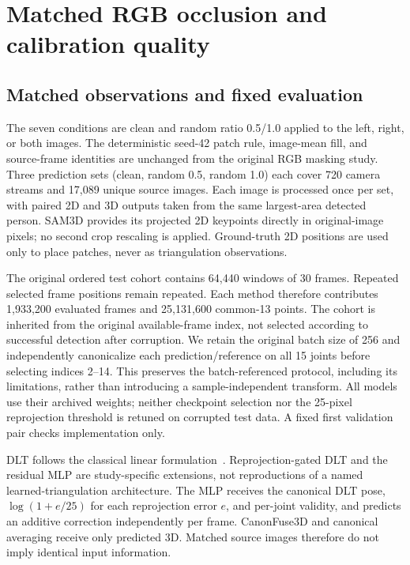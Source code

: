 \FloatBarrier
\section{Matched RGB occlusion and calibration quality}
\label{sec:c07_matched_geometry}

\subsection{Matched observations and fixed evaluation}
The seven conditions are clean and random ratio 0.5/1.0 applied to the left, right, or both images. The deterministic seed-42 patch rule, image-mean fill, and source-frame identities are unchanged from the original RGB masking study. Three prediction sets (clean, random 0.5, random 1.0) each cover 720 camera streams and 17,089 unique source images. Each image is processed once per set, with paired 2D and 3D outputs taken from the same largest-area detected person. SAM3D provides its projected 2D keypoints directly in original-image pixels; no second crop rescaling is applied. Ground-truth 2D positions are used only to place patches, never as triangulation observations.

The original ordered test cohort contains 64,440 windows of 30 frames. Repeated selected frame positions remain repeated. Each method therefore contributes 1,933,200 evaluated frames and 25,131,600 common-13 points. The cohort is inherited from the original available-frame index, not selected according to successful detection after corruption. We retain the original batch size of 256 and independently canonicalize each prediction/reference on all 15 joints before selecting indices 2--14. This preserves the batch-referenced protocol, including its limitations, rather than introducing a sample-independent transform. All models use their archived weights; neither checkpoint selection nor the 25-pixel reprojection threshold is retuned on corrupted test data. A fixed first validation pair checks implementation only.

DLT follows the classical linear formulation~\cite{hartley2004multiple}. Reprojection-gated DLT and the residual MLP are study-specific extensions, not reproductions of a named learned-triangulation architecture. The MLP receives the canonical DLT pose, $\log(1+e/25)$ for each reprojection error $e$, and per-joint validity, and predicts an additive correction independently per frame. CanonFuse3D and canonical averaging receive only predicted 3D. Matched source images therefore do not imply identical input information.

